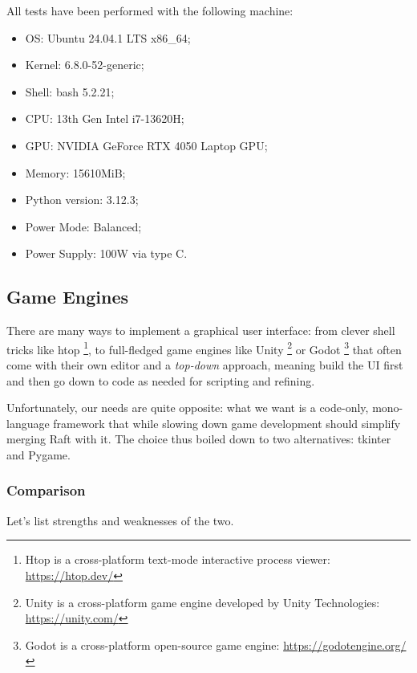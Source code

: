 All tests have been performed with the following machine: 

\begin{itemize}
    \item OS: Ubuntu 24.04.1 LTS x86\_64;
    \item Kernel: 6.8.0-52-generic;
    \item Shell: bash 5.2.21;
    \item CPU: 13th Gen Intel i7-13620H;
    \item GPU: NVIDIA GeForce RTX 4050 Laptop GPU;
    \item Memory: 15610MiB;
    \item Python version: 3.12.3;
    \item Power Mode: Balanced;
    \item Power Supply: 100W via type C.
\end{itemize}

\subsection{Game Engines} \label{sec:pygame}

There are many ways to implement a graphical user interface: from clever shell tricks like htop \footnote{Htop is a cross-platform text-mode interactive process viewer: \url{https://htop.dev/}}, to full-fledged game engines like Unity \footnote{Unity is a cross-platform game engine developed by Unity Technologies: \url{https://unity.com/}} or Godot \footnote{Godot is a cross-platform open-source game engine: \url{https://godotengine.org/}} that often come with their own editor and a \textit{top-down} approach, meaning build the UI first and then go down to code as needed for scripting and refining.

Unfortunately, our needs are quite opposite: what we want is a code-only, mono-language framework that while slowing down game development should simplify merging Raft with it. The choice thus boiled down to two alternatives: tkinter and Pygame. 

\subsubsection{Comparison}

Let's list strengths and weaknesses of the two.

